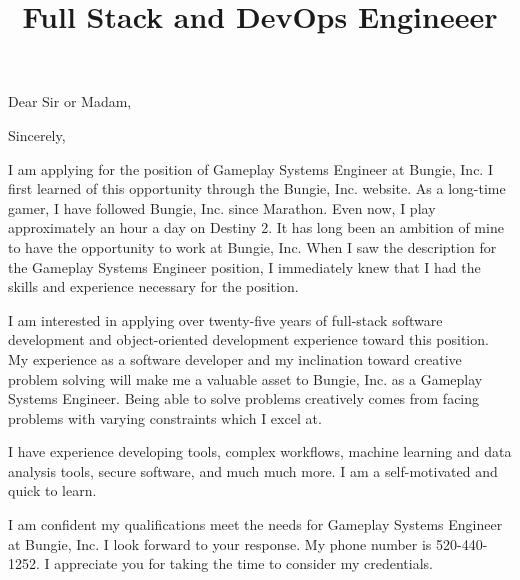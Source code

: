 \documentclass[11pt,a4paper,sans]{moderncv}        %
\title{Full Stack and DevOps Engineeer}                               %
\begin{document}
\opening{Dear Sir or Madam,}
\closing{Sincerely,}
\makelettertitle


I am applying for the position of Gameplay Systems Engineer at Bungie, Inc. I first learned of this opportunity through the Bungie, Inc. website. 
As a long-time gamer, I have followed Bungie, Inc. since Marathon. Even now, I play approximately an hour a day on Destiny 2. It has long been an 
ambition of mine to have the opportunity to work at Bungie, Inc. When I saw the description for the Gameplay Systems Engineer position, I immediately
knew that I had the skills and experience necessary for the position.

I am interested in applying over twenty-five years of full-stack software development and object-oriented development experience toward this position.
My experience as a software developer and my inclination toward creative problem solving will make me a valuable asset to Bungie, Inc. as a Gameplay
Systems Engineer. Being able to solve problems creatively comes from facing problems with varying constraints which I excel at.

I have experience developing tools, complex workflows, machine learning and data analysis tools, secure software, and much much more. I am a self-motivated
and quick to learn.

I am confident my qualifications meet the needs for Gameplay Systems Engineer at Bungie, Inc. I look forward to your response. My phone number is 520-440-1252.
I appreciate you for taking the time to consider my credentials.


\makeletterclosing
\end{document}
